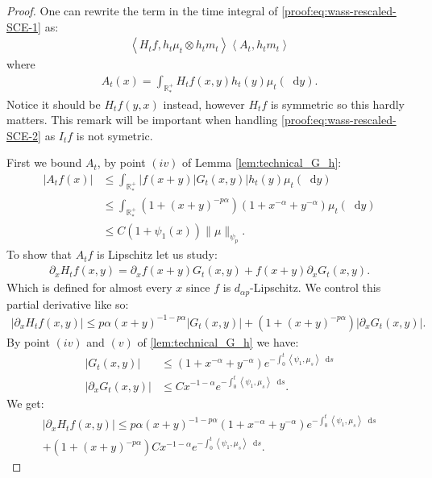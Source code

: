 \documentclass[11pt,a4paper]{article}
\newcommand{\RRP}{\mathbb{R}^+_*}
\newcommand{\brac}[1]{\left\langle#1\right\rangle}
\newcommand{\dd}{\mathop{}\!\mathrm{d}}
\begin{document}
\begin{proof}
    One can rewrite the term in the time integral of \eqref{proof:eq:wass-rescaled-SCE-1} as:
    \begin{align*}
        \brac{H_tf,h_t\mu_t \otimes h_t m_t} \brac{A_t,h_t m_t}
    \end{align*}
    where
    \begin{align*}
        A_t(x) = \int_{\RRP} H_tf(x,y) h_t(y) \mu_t(\dd y).
    \end{align*}    
    Notice it should be $H_tf(y,x)$ instead, however $H_tf$ is symmetric so this hardly matters. This remark will be important when handling \eqref{proof:eq:wass-rescaled-SCE-2} as $I_tf$ is not symetric. 
    
    First we bound $A_t$, by point $(iv)$ of Lemma \ref{lem:technical_G_h}:
    \begin{align*}
        \left|A_tf(x)\right| &\leq \int_{\RRP} |f(x+y)|G_t(x,y)| h_t(y)\mu_t(\dd y)\\
        &\leq \int_{\RRP} (1 + (x+y)^{-p\alpha})(1 +x^{-\alpha} +y^{-\alpha})  \mu_t(\dd y) \\
        &\leq C(1 + \psi_1(x)) \| \mu\|_{\psi_{p}}.
    \end{align*}
    To show that  $A_tf$ is Lipschitz let us study:
    \begin{align*}
        \partial_x H_tf(x,y) = \partial_x f(x+y) G_t(x,y) + f(x+y) \partial_x G_t(x,y).
    \end{align*}
    Which is defined for almost every $x$ since $f$ is $d_{\alpha p}$-Lipschitz. We control this partial derivative like so:
    \begin{align*}
        \left|\partial_x H_tf(x,y) \right| \leq p\alpha (x+y)^{-1-p\alpha} \left|G_t(x,y) \right| + \left( 1 + (x+y)^{-p\alpha} \right) \left|\partial_x G_t(x,y) \right|.
    \end{align*}
    By point $(iv)$ and $(v)$ of \ref{lem:technical_G_h} we have:
    \begin{align*}
        \left|G_t(x,y) \right| &\leq (1 + x^{-\alpha} + y^{-\alpha}) e^{-\int_0^t \brac{\psi_1,\mu_s}\dd s} \\
        \left|\partial_x G_t(x,y) \right| &\leq  C x^{-1-\alpha} e^{-\int_0^t \brac{\psi_1,\mu_s}\dd s}.
    \end{align*}
    We get:
    \begin{multline*}
        \left|\partial_x H_tf(x,y) \right| \leq p\alpha (x+y)^{-1-p\alpha} (1 + x^{-\alpha} + y^{-\alpha})e^{-\int_0^t \brac{\psi_1,\mu_s}\dd s} \\
        +  \left( 1 + (x+y)^{-p\alpha} \right)C x^{-1-\alpha}e^{-\int_0^t \brac{\psi_1,\mu_s}\dd s}.

\end{multline*}
\end{proof}
\end{document}
